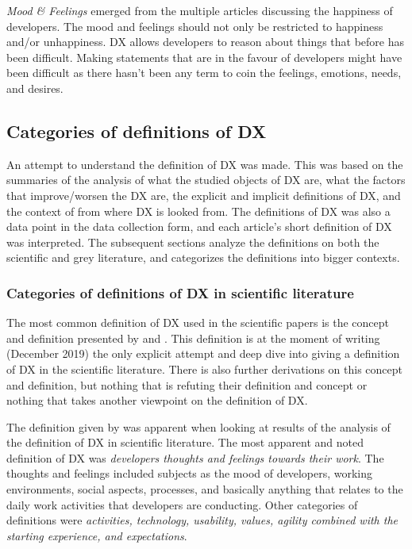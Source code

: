 \documentclass[english, 12pt, a4paper, sci, utf8, a-1b, online]{aaltothesis}
\newcommand{\now}{December 2019}
\begin{document}
\textit{Mood \& Feelings} emerged from the multiple articles discussing the happiness of developers. The mood and feelings should not only be restricted to happiness and/or unhappiness. DX allows developers to reason about things that before has been difficult. Making statements that are in the favour of developers might have been difficult as there hasn't been any term to coin the feelings, emotions, needs, and desires.

\subsection{Categories of definitions of DX}

An attempt to understand the definition of DX was made. This was based on the summaries of the analysis of what the studied objects of DX are, what the factors that improve/worsen the DX are, the explicit and implicit definitions of DX, and the context of from where DX is looked from. The definitions of DX was also a data point in the data collection form, and each article's short definition of DX was interpreted. The subsequent sections analyze the definitions on both the scientific and grey literature, and categorizes the definitions into bigger contexts.

\subsubsection{Categories of definitions of DX in scientific literature}

The most common definition of DX used in the scientific papers is the concept and definition presented by \textcite{fagerholm-dx-concept-and-definition} and \textcite{fagerholm-doctoral-thesis}. This definition is at the moment of writing (\now) the only explicit attempt and deep dive into giving a definition of DX in the scientific literature. There is also further derivations on this concept and definition, but nothing that is refuting their definition and concept or nothing that takes another viewpoint on the definition of DX.

The definition given by \textcite{fagerholm-dx-concept-and-definition} was apparent when looking at results of the analysis of the definition of DX in scientific literature. The most apparent and noted definition of DX was \textit{developers thoughts and feelings towards their work}. The thoughts and feelings included subjects as the mood of developers, working environments, social aspects, processes, and basically anything that relates to the daily work activities that developers are conducting. Other categories of definitions were \textit{activities, technology, usability, values, agility combined with the starting experience, and expectations}.
\end{document}
